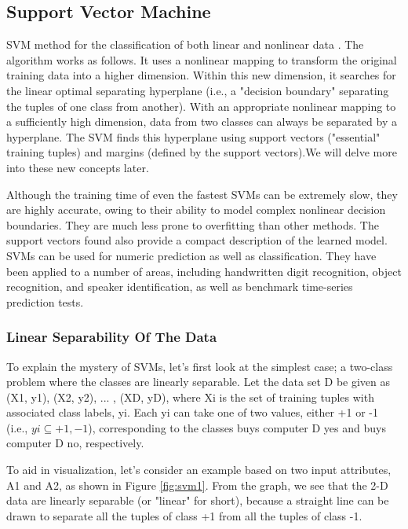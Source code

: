\subsection{Support Vector Machine}
SVM method for the classification of both linear and nonlinear data \cite{classifications}. The algorithm works as follows. It uses a nonlinear mapping to transform the original training data into a higher dimension. Within this new dimension, it searches for the linear optimal separating hyperplane (i.e., a "decision boundary" separating the tuples of one class from another). With an appropriate nonlinear mapping to a sufficiently high dimension, data from two classes can always be separated by a hyperplane. The SVM finds this hyperplane using support vectors ("essential" training tuples) and margins (defined by the support vectors).We will delve more into these new concepts later.


Although the training time of even the fastest SVMs can be extremely slow, they are highly accurate, owing to their ability to model complex nonlinear decision boundaries. They are much less prone to overfitting than other methods. The support vectors found also provide a compact description of the learned model. SVMs can be used for numeric prediction as well as classification. They have been applied to a number of areas, including handwritten digit recognition, object recognition, and speaker identification, as well as benchmark time-series prediction tests.
 \bigskip
\subsubsection{Linear Separability Of The Data}
To explain the mystery of SVMs, let's first look at the simplest case; a two-class problem where the classes are linearly separable. Let the data set D be given as (X1, y1),
(X2, y2), ... , (XD, yD), where Xi is the set of training tuples with associated class labels, yi. Each yi can take one of two values, either +1 or -1 (i.e., $yi \subseteq{+1,-1}$), corresponding to the classes buys computer D yes and buys computer D no, respectively.\bigskip

To aid in visualization, let's consider an example based on two input attributes, A1 and A2, as shown in Figure \ref{fig:svm1}. From the graph, we see that the 2-D data are linearly separable (or "linear" for short), because a straight line can be drawn to separate all the tuples of class +1 from all the tuples of class -1.\bigskip

